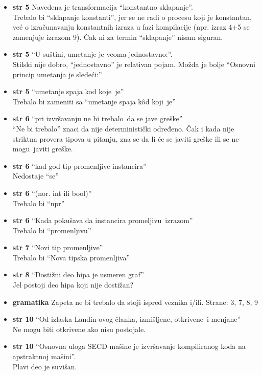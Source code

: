 \documentclass[a4paper]{report}
\begin{document}
\begin{itemize}
\item \textbf{str 5} Navedena je transformacija ``konstantno sklapanje''.\\Trebalo bi ``sklapanje konstanti'', jer se ne radi o procesu koji je konstantan, već o izračunavanju konstantnih izraza u fazi kompilacije (npr. izraz 4+5 se zamenjuje izrazom 9). Čak ni za termin ``sklapanje'' nisam siguran.
\item \textbf{str 5} ``U suštini, umetanje je veoma jednostavno:''.\\ Stilski nije dobro, ``jednostavno'' je relativan pojam. Možda je bolje ``Osnovni princip umetanja je sledeći:''
\item \textbf{str 5} ``umetanje spaja \color{blue}kod koje\color{black}~je''\\ Trebalo bi zameniti sa ``umetanje spaja \color{blue}kôd koji\color{black}~je''
\item \textbf{str 6} ``pri izvršavanju \color{blue}ne bi trebalo\color{black}~da se jave greške'' \\ ``Ne bi trebalo'' znaci da nije deterministički određeno. Čak i kada nije striktna provera tipova u pitanju, zna se da li će se javiti greške ili se \color{blue}ne mogu\color{black}~javiti greške.
\item \textbf{str 6} ``kad god tip promenljive instancira'' \\ Nedostaje ``se''
\item \textbf{str 6} ``(\color{blue}nor\color{black}. int ili bool)'' \\ Trebalo bi ``npr''
\item \textbf{str 6} ``Kada pokušava da instancira \color{blue}promeljivu\color{black}~izrazom'' \\ Trebalo bi ``promenljivu''
\item \textbf{str 7} ``Novi tip promenljive'' \\ Trebalo bi ``Nova tipska promenljiva''
\item \textbf{str 8} ``Dostižni deo hipa je usmeren graf'' \\ Jel postoji deo hipa koji nije dostižan?
\item \textbf{gramatika} Zapeta ne bi trebalo da stoji ispred veznika i/ili. Strane: 3, 7, 8, 9
\item \textbf{str 10} ``Od izlaska Landin-ovog članka, izmišljene, \color{blue}otkrivene\color{black}~i menjane'' \\ Ne mogu biti otkrivene ako nisu postojale.
\item \textbf{str 10} ``Osnovna uloga SECD mašine je izvršavanje kompiliranog koda \color{blue}na apstraktnoj mašini\color{black}''. \\ Plavi deo je suvišan.

\end{itemize}
\end{document}
